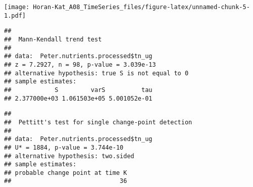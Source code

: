 \documentclass[]{article}
\newenvironment{Shaded}{\begin{snugshade}}{\end{snugshade}}
\newcommand{\KeywordTok}[1]{\textcolor[rgb]{0.13,0.29,0.53}{\textbf{#1}}}
\newcommand{\DecValTok}[1]{\textcolor[rgb]{0.00,0.00,0.81}{#1}}
\newcommand{\StringTok}[1]{\textcolor[rgb]{0.31,0.60,0.02}{#1}}
\newcommand{\CommentTok}[1]{\textcolor[rgb]{0.56,0.35,0.01}{\textit{#1}}}
\newcommand{\OperatorTok}[1]{\textcolor[rgb]{0.81,0.36,0.00}{\textbf{#1}}}
\newcommand{\NormalTok}[1]{#1}
\begin{document}
\texttt{[image: Horan-Kat\_A08\_TimeSeries\_files/figure-latex/unnamed-chunk-5-1.pdf]}

\begin{Shaded}
\end{Shaded}

\begin{verbatim}
## 
##  Mann-Kendall trend test
## 
## data:  Peter.nutrients.processed$tn_ug
## z = 7.2927, n = 98, p-value = 3.039e-13
## alternative hypothesis: true S is not equal to 0
## sample estimates:
##            S         varS          tau 
## 2.377000e+03 1.061503e+05 5.001052e-01
\end{verbatim}

\begin{Shaded}
\end{Shaded}

\begin{verbatim}
## 
##  Pettitt's test for single change-point detection
## 
## data:  Peter.nutrients.processed$tn_ug
## U* = 1884, p-value = 3.744e-10
## alternative hypothesis: two.sided
## sample estimates:
## probable change point at time K 
##                              36
\end{verbatim}

\begin{Shaded}
\end{Shaded}
\end{document}
